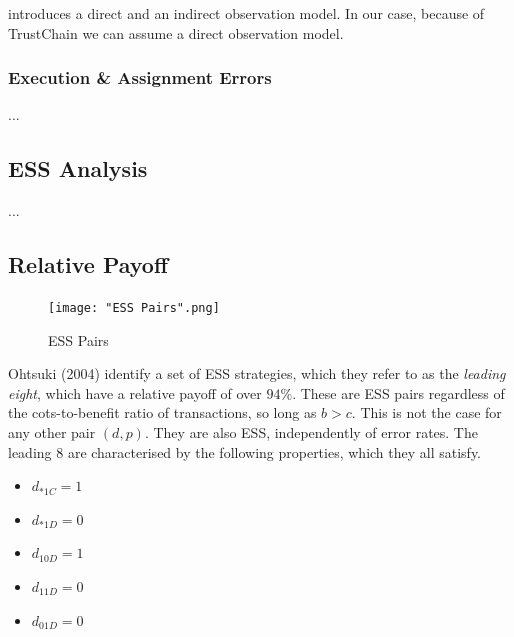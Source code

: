 \documentclass[11pt,a4paper]{article}
\theoremstyle{definition}
\theoremstyle{theorem}
\theoremstyle{proposition}
\theoremstyle{corollary}
\theoremstyle{lemma}
\theoremstyle{example}
\theoremstyle{remark}
\begin{document}
\noindent{} \cite{How Should we Define Goodness} introduces a direct and an indirect observation model. In our case, because of TrustChain we can assume a direct observation model. 

\subsubsection{Execution \& Assignment Errors}
\label{subsubsec:Execution & Assignment Errors}
...
\subsection{ESS Analysis}
\label{subsec:ESS Analysis}
...
\subsection{Relative Payoff}
\label{subsec:Relative Payoff}

{\centering
\begin{figure}[H]
\begin{center}
\texttt{[image: "ESS Pairs".png]}
\end{center}
\label{fig:ESS Pairs}
\caption{ESS Pairs}
\end{figure}
}

Ohtsuki (2004) identify a set of ESS strategies, which they refer to as the {\it leading eight}, which have a relative payoff of over $94\%$. These are ESS pairs regardless of the cots-to-benefit ratio of transactions, so long as $b>c$. This is not the case for any other pair $(d,p).$ They are also ESS, independently of error rates. The leading 8 are characterised by the following properties, which they all satisfy.
\begin{itemize}
\item $d_{*1C}=1$ 
\item $d_{*1D}=0$
\item $d_{10D}=1$
\item $d_{11D}=0$
\item $d_{01D}=0$
\end{itemize}
\end{document}
